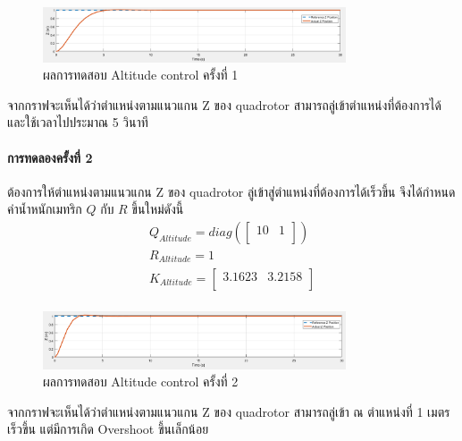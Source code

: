 \begin{figure}[!ht]
	\centering
	\includegraphics[width=0.8\textwidth]{images/simulink/altitude_control1.png}
	\caption{ผลการทดสอบ Altitude control ครั้งที่ 1}
\end{figure}

จากกราฟจะเห็นได้ว่าตำแหน่งตามแนวแกน Z ของ quadrotor สามารถลู่เข้าตำแหน่งที่ต้องการได้และใช้เวลาไปประมาณ 5 วินาที

\paragraph*{การทดลองครั้งที่ 2}
ต้องการให้ตำแหน่งตามแนวแกน Z ของ quadrotor ลู่เข้าสู่ตำแหน่งที่ต้องการได้เร็วขึ้น จึงได้กำหนดค่าน้ำหนักเมทริก
$Q$ กับ $R$ ขึ้นใหม่ดังนี้ 
\begin{equation}
    \begin{array}{c}
    {Q_{Altitude}=diag(\begin{bmatrix}
        10 & 1 \\
    \end{bmatrix})}\\[10pt]
    {R_{Altitude} = 1}\\[10pt]
    {K_{Altitude} = \begin{bmatrix}
        3.1623 & 3.2158 \\
    \end{bmatrix}} \\[10pt]
    \end{array}
\end{equation}

\begin{figure}[!ht]
	\centering
	\includegraphics[width=0.8\textwidth]{images/simulink/altitude_control2.png}
	\caption{ผลการทดสอบ Altitude control ครั้งที่ 2}
\end{figure}
 
จากกราฟจะเห็นได้ว่าตำแหน่งตามแนวแกน Z ของ quadrotor สามารถลู่เข้า ณ ตำแหน่งที่ 1 เมตรเร็วขึ้น แต่มีการเกิด Overshoot ขึ้นเล็กน้อย

